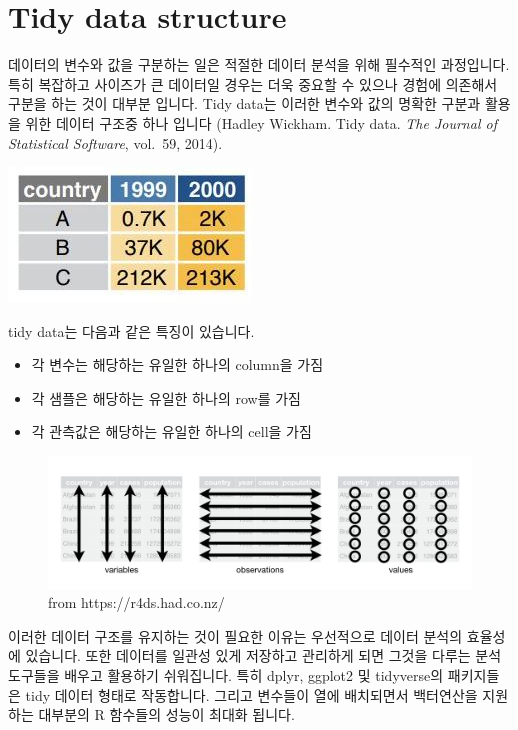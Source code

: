\documentclass[
  a4paper,
]{book}
\providecommand{\tightlist}{%
  \setlength{\itemsep}{0pt}\setlength{\parskip}{0pt}}\usepackage{longtable,booktabs,array}
\begin{document}
\hypertarget{tidy-data-structure}{%
\section{Tidy data structure}\label{tidy-data-structure}}

데이터의 변수와 값을 구분하는 일은 적절한 데이터 분석을 위해 필수적인
과정입니다. 특히 복잡하고 사이즈가 큰 데이터일 경우는 더욱 중요할 수
있으나 경험에 의존해서 구분을 하는 것이 대부분 입니다. Tidy data는
이러한 변수와 값의 명확한 구분과 활용을 위한 데이터 구조중 하나 입니다
(Hadley Wickham. Tidy data. \emph{The Journal of Statistical Software},
vol.~59, 2014).

\includegraphics{images/07/notidy.JPG}

tidy data는 다음과 같은 특징이 있습니다.

\begin{itemize}
\tightlist
\item
  각 변수는 해당하는 유일한 하나의 column을 가짐
\item
  각 샘플은 해당하는 유일한 하나의 row를 가짐
\item
  각 관측값은 해당하는 유일한 하나의 cell을 가짐
\end{itemize}

\begin{figure}

{\centering \includegraphics[width=6.25in,height=\textheight]{images/07/tidy-1.png}

}

\caption{from https://r4ds.had.co.nz/}

\end{figure}

이러한 데이터 구조를 유지하는 것이 필요한 이유는 우선적으로 데이터
분석의 효율성에 있습니다. 또한 데이터를 일관성 있게 저장하고 관리하게
되면 그것을 다루는 분석 도구들을 배우고 활용하기 쉬워집니다. 특히 dplyr,
ggplot2 및 tidyverse의 패키지들은 tidy 데이터 형태로 작동합니다. 그리고
변수들이 열에 배치되면서 백터연산을 지원하는 대부분의 R 함수들의 성능이
최대화 됩니다.
\end{document}

